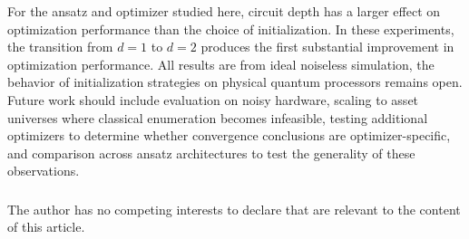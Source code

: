 \documentclass[runningheads]{llncs}
\begin{document}
For the ansatz and optimizer studied here, circuit depth has a larger effect on optimization performance than the choice of initialization. In these experiments, the transition from $d = 1$ to $d = 2$ produces the first substantial improvement in optimization performance. All results are from ideal noiseless simulation, the behavior of initialization strategies on physical quantum processors remains open. Future work should include evaluation on noisy hardware, scaling to asset universes where classical enumeration becomes infeasible, testing additional optimizers to determine whether convergence conclusions are optimizer-specific, and comparison across ansatz architectures to test the generality of these observations.

\begin{credits}
\subsubsection{\discintname}
The author has no competing interests to declare that are relevant to the content of this article.
\end{credits}
\end{document}
